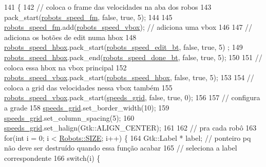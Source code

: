 \begin{DoxyCode}
141                                    \{
142     \textcolor{comment}{// coloca o frame das velocidades na aba dos robos}
143     pack\_start(\hyperlink{class_robot_g_u_i_a13eebe1d64530f8cb3454f78589bb4ce}{robots\_speed\_fm}, \textcolor{keyword}{false}, \textcolor{keyword}{true}, 5);
144 
145     \hyperlink{class_robot_g_u_i_a13eebe1d64530f8cb3454f78589bb4ce}{robots\_speed\_fm}.add(\hyperlink{class_robot_g_u_i_a51bc5745e08692bd88195e623b5eb74a}{robots\_speed\_vbox}); \textcolor{comment}{// adiciona uma vbox}
146 
147     \textcolor{comment}{// adiciona os botões de edit numa hbox}
148     \hyperlink{class_robot_g_u_i_a6723822512ce408ab5c3f4c27d335363}{robots\_speed\_hbox}.pack\_start(\hyperlink{class_robot_g_u_i_aeb9008eb20d42d90fe39564179598d6d}{robots\_speed\_edit\_bt}, \textcolor{keyword}{false}, \textcolor{keyword}{true}, 5)
      ;
149     \hyperlink{class_robot_g_u_i_a6723822512ce408ab5c3f4c27d335363}{robots\_speed\_hbox}.pack\_end(\hyperlink{class_robot_g_u_i_accc677ab2d9cd534389956e6d41ee55c}{robots\_speed\_done\_bt}, \textcolor{keyword}{false}, \textcolor{keyword}{true}, 5);
150 
151     \textcolor{comment}{// coloca essa hbox na vbox principal}
152     \hyperlink{class_robot_g_u_i_a51bc5745e08692bd88195e623b5eb74a}{robots\_speed\_vbox}.pack\_start(\hyperlink{class_robot_g_u_i_a6723822512ce408ab5c3f4c27d335363}{robots\_speed\_hbox}, \textcolor{keyword}{false}, \textcolor{keyword}{true}, 5);
153 
154     \textcolor{comment}{// coloca a grid das velocidades nessa vbox também}
155     \hyperlink{class_robot_g_u_i_a51bc5745e08692bd88195e623b5eb74a}{robots\_speed\_vbox}.pack\_start(\hyperlink{class_robot_g_u_i_a630a21b85d6a9583f77d0a97a2be66e4}{speeds\_grid}, \textcolor{keyword}{false}, \textcolor{keyword}{true}, 0);
156 
157     \textcolor{comment}{// configura a grade}
158     \hyperlink{class_robot_g_u_i_a630a21b85d6a9583f77d0a97a2be66e4}{speeds\_grid}.set\_border\_width(10);
159     \hyperlink{class_robot_g_u_i_a630a21b85d6a9583f77d0a97a2be66e4}{speeds\_grid}.set\_column\_spacing(5);
160     \hyperlink{class_robot_g_u_i_a630a21b85d6a9583f77d0a97a2be66e4}{speeds\_grid}.set\_halign(Gtk::ALIGN\_CENTER);
161 
162     \textcolor{comment}{// pra cada robô}
163     \textcolor{keywordflow}{for}(\textcolor{keywordtype}{int} i = 0; i < \hyperlink{class_robots_ae9df2f1d345ad6740f0459956cdd4712}{Robots::SIZE}; i++) \{
164         Gtk::Label * label; \textcolor{comment}{// ponteiro pq não deve ser destruído quando essa função acabar}
165         \textcolor{comment}{// seleciona a label correspondente}
166         \textcolor{keywordflow}{switch}(i) \{

\end{DoxyCode}
